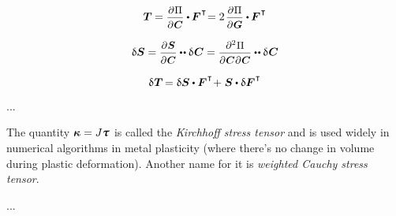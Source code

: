 \begin{otherlanguage}{russian}
\begin{equation*}
\firstpiolakirchhoffstress \hspace{-0.1ex}
= \scalebox{0.92}{$ \displaystyle \frac{\partial \hspace{.1ex} \potentialenergydensity}{\raisemath{-0.1em}{\partial \hspace{.1ex} \bm{C}}} $} \dotp \hspace{-0.1ex} \bm{F}^{\hspace{.1ex}\T} \hspace{-0.5ex}
= 2 \hspace{.25ex} \scalebox{0.92}{$ \displaystyle \frac{\partial \hspace{.1ex} \potentialenergydensity}{\raisemath{-0.1em}{\partial \hspace{.1ex} \bm{G}}} $} \dotp \hspace{-0.1ex} \bm{F}^{\hspace{.1ex}\T}
\end{equation*}

\begin{equation*}
\variation{\secondpiolakirchhoffstress}
= \scalebox{0.92}{$ \displaystyle \frac{\partial \hspace{.1ex} \bm{S}}{\raisemath{-0.1em}{\partial \hspace{.1ex} \bm{C}}} $} \dotdotp \variation{\hspace{.12ex}\bm{C}}
= \scalebox{0.92}{$ \displaystyle \frac{\partial^2 \hspace{0.1ex} \potentialenergydensity}{\raisemath{-0.1em}{\partial \hspace{0.1ex} \bm{C} \hspace{0.1ex} \partial \hspace{0.1ex} \bm{C}}} $} \dotdotp \variation{\hspace{.12ex}\bm{C}}
\end{equation*}

\begin{equation*}
\variation{\hspace{.1ex}\firstpiolakirchhoffstress} \hspace{-0.2ex} =
\variation{\secondpiolakirchhoffstress} \dotp \bm{F}^{\hspace{.1ex}\T} \hspace{-0.4ex} + \hspace{.1ex}
\secondpiolakirchhoffstress \dotp \variation{\bm{F}}^{\hspace{.1ex}\T}
\end{equation*}

...

{\small
The quantity ${\bm{\kappa} = J \cauchystress}$ is called the \emph{Kirchhoff stress tensor} and is used widely in numerical algorithms in metal plasticity (where there’s no change in volume during plastic deformation).
Another name for it is \emph{weighted Cauchy stress tensor}.
\par}

...

\end{otherlanguage}

